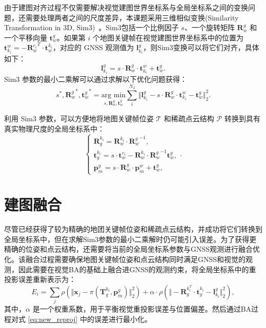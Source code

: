 由于建图对齐过程不仅需要解决视觉建图世界坐标系与全局坐标系之间的变换问题，还需要处理两者之间的尺度差异，本课题采用三维相似变换(Similarity Transformation in 3D, Sim3)~\cite{horn1987closed}。Sim3包括一个比例因子 $s$、一个旋转矩阵 $\mathbf{R}_w^g$ 和一个平移向量 $\mathbf{t}_w^g$。如果第 $i$ 个地图关键帧在视觉建图世界坐标系中的位置为 $\mathbf{t}_{k_i}^{w} = -{\mathbf{R}_w^{c_i}}^T \cdot \mathbf{t}_w^{k_i}$，对应的 GNSS 观测值为 $\mathbf{l}_{k_i}^g$，则Sim3变换可以将它们对齐，具体如下：
\begin{equation}
    \mathbf{l}_{k_i}^g = s \cdot \mathbf{R}_w^g \cdot \mathbf{t}_{k_i}^{w} + \mathbf{t}_w^g.
\end{equation}
Sim3 参数的最小二乘解可以通过求解以下优化问题获得：
\begin{equation}
  s^*, {\mathbf{R}_w^g}^*, {\mathbf{t}_w^g}^* = \underset{s,\mathbf{R}_w^g,\mathbf{t}_w^g}{\text{arg min}} \sum_i^{N_I} \Vert \mathbf{l}_{k_i}^g - s \cdot \mathbf{R}_w^g \cdot \mathbf{t}_{k_i}^{w} - \mathbf{t}_w^g \Vert_2^2.
\end{equation}

利用 Sim3 参数，可以方便地将地图关键帧位姿 $\mathcal{T}$ 和稀疏点云结构 $\mathcal{P}$ 转换到具有真实物理尺度的全局坐标系中：
\begin{equation}
\begin{cases}
    \mathbf{R}^{k_i}_g = {\mathbf{R}^{k_i}_{w}} \cdot {\mathbf{R}_w^g}^{-1}, \\
    \mathbf{t}^{k_i}_g = s \cdot \mathbf{t}_w^{c_i} - {\mathbf{R}^{k_i}_{w}} \cdot {\mathbf{R}^{g}_{w}}^{-1} \mathbf{t}_w^g, \\
    \mathbf{p}_m^g = s \cdot \mathbf{R}_w^g \cdot \mathbf{p}_{m}^{w} + \mathbf{t}_w^g,
\end{cases}.
\end{equation}

\section{建图融合}

尽管已经获得了较为精确的地团关键帧位姿和稀疏点云结构，并成功将它们转换到全局坐标系中，但在求解Sim3参数的最小二乘解时仍可能引入误差。为了获得更精确的位姿和点云结构，还需要将当前的全局坐标系参数与GNSS观测进行融合优化。该融合过程需要确保地图关键帧位姿和点云结构同时满足GNSS和视觉的观测，因此需要在视觉BA的基础上融合进GNSS的观测约束，将全局坐标系中的重投影误差重新表示为：
\begin{equation}
\label{eq:new_reproj}
    E_i = \sum_{j}\rho\left(\Vert \mathbf{x}_j - \pi(\mathbf{T}^{k_i}_g, \mathbf{p}_{m}^{g}) \Vert ^2_2\right) 
    + \alpha \cdot \rho\left(\Vert -\mathbf{R}_g^{k_i^T}\cdot\mathbf{t}_g^{k_i} - \mathbf{l}_{k_i}^g \Vert_2^2\right),
\end{equation}
其中，$\alpha$ 是一个权重系数，用于平衡视觉重投影误差与位置偏差。然后通过BA过程对式 \eqref{eq:new_reproj} 中的误差进行最小化。

